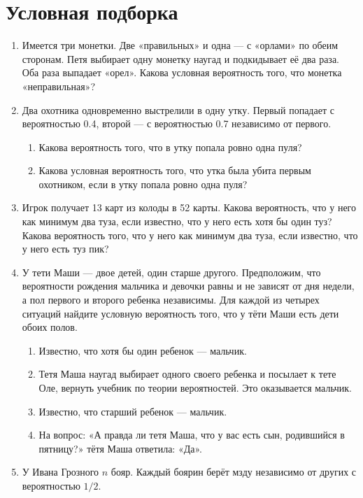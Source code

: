 \documentclass[12pt]{article}
\theoremstyle{definition}
\begin{document}
\section{Условная подборка}
\begin{enumerate}
  \item Имеется три монетки. Две «правильных» и одна — с
  «орлами» по обеим сторонам. Петя выбирает одну монетку наугад и
  подкидывает её два раза. Оба раза выпадает «орел». Какова
  условная вероятность того, что монетка «неправильная»?
\item   Два охотника одновременно выстрелили в одну утку. Первый попадает с
вероятностью 0.4, второй — с вероятностью 0.7 независимо от первого.
\begin{enumerate}
\item Какова вероятность того, что в утку попала ровно одна пуля?
\item  Какова условная вероятность того, что утка была убита первым
охотником, если в утку попала ровно одна пуля?
\end{enumerate}
\item Игрок получает 13 карт из колоды в 52 карты.
Какова вероятность, что у него как минимум два туза, если
известно, что у него есть хотя бы один туз?
Какова вероятность того, что у него как минимум два туза, если
известно, что у него есть туз пик?
\item У тети Маши — двое детей, один старше другого. Предположим, что вероятности рождения мальчика и девочки равны и не зависят от дня недели, а пол первого и второго ребенка независимы. Для каждой из четырех ситуаций найдите условную вероятность того, что у тёти Маши есть дети обоих полов.
\begin{enumerate}
\item Известно, что хотя бы один ребенок — мальчик.
\item Тетя Маша наугад выбирает одного своего
ребенка и посылает к тете Оле, вернуть учебник по теории
вероятностей. Это оказывается мальчик.
\item Известно, что старший ребенок — мальчик.
\item На вопрос: «А правда ли тетя Маша, что у вас есть сын, родившийся в пятницу?» тётя Маша ответила: «Да».
\end{enumerate}
\item У Ивана Грозного $n$ бояр. 
Каждый боярин берёт мзду независимо от других с вероятностью $1/2$.


\end{enumerate}
\end{document}
